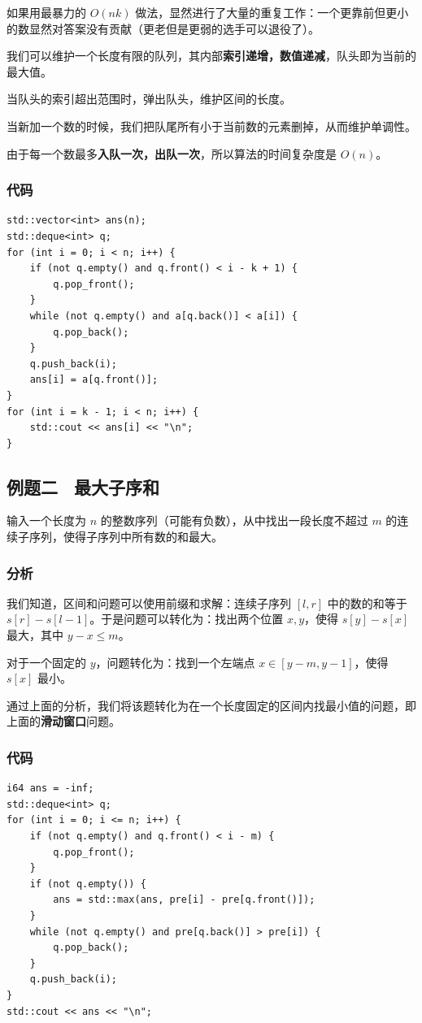 \documentclass{report}
\begin{document}
如果用最暴力的 $O(n k)$ 做法，显然进行了大量的重复工作：一个更靠前但更小的数显然对答案没有贡献（更老但是更弱的选手可以退役了）。

我们可以维护一个长度有限的队列，其内部\textbf{索引递增，数值递减}，队头即为当前的最大值。

当队头的索引超出范围时，弹出队头，维护区间的长度。

当新加一个数的时候，我们把队尾所有小于当前数的元素删掉，从而维护单调性。

由于每一个数最多\textbf{入队一次，出队一次}，所以算法的时间复杂度是 $O(n)$。

\newpage

\subsubsection{代码}

\begin{verbatim}
std::vector<int> ans(n);
std::deque<int> q;
for (int i = 0; i < n; i++) {
    if (not q.empty() and q.front() < i - k + 1) {
        q.pop_front();
    }
    while (not q.empty() and a[q.back()] < a[i]) {
        q.pop_back();
    }
    q.push_back(i);
    ans[i] = a[q.front()];
}
for (int i = k - 1; i < n; i++) {
    std::cout << ans[i] << "\n";
}
\end{verbatim}

\subsection{例题二 \ 最大子序和}

输入一个长度为 $n$ 的整数序列（可能有负数），从中找出一段长度不超过 $m$ 的连续子序列，使得子序列中所有数的和最大。

\subsubsection{分析}

我们知道，区间和问题可以使用前缀和求解：连续子序列 $[l, r]$ 中的数的和等于 $s[r] - s[l - 1]$。于是问题可以转化为：找出两个位置 $x, y$，使得 $s[y] - s[x]$ 最大，其中 $y - x \le m$。

对于一个固定的 $y$，问题转化为：找到一个左端点 $x \in [y - m, y - 1]$，使得 $s[x]$ 最小。

通过上面的分析，我们将该题转化为在一个长度固定的区间内找最小值的问题，即上面的\textbf{滑动窗口}问题。

\subsubsection{代码}

\begin{verbatim}
i64 ans = -inf;
std::deque<int> q;
for (int i = 0; i <= n; i++) {
    if (not q.empty() and q.front() < i - m) {
        q.pop_front();
    }
    if (not q.empty()) {
        ans = std::max(ans, pre[i] - pre[q.front()]);
    }
    while (not q.empty() and pre[q.back()] > pre[i]) {
        q.pop_back();
    }
    q.push_back(i);
}
std::cout << ans << "\n";
\end{verbatim}
\end{document}
